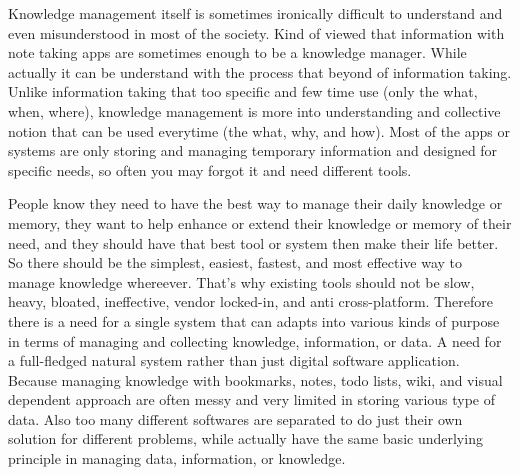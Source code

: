Knowledge management itself is sometimes ironically difficult to understand and even misunderstood in most of the society.
Kind of viewed that information with note taking apps are sometimes enough to be a knowledge manager.
While actually it can be understand with the process that beyond of information taking.
Unlike information taking that too specific and few time use (only the what, when, where), knowledge management is more into understanding and collective notion that can be used everytime (the what, why, and how).
Most of the apps or systems are only storing and managing temporary information and designed for specific needs, so often you may forgot it and need different tools.

People know they need to have the best way to manage their daily knowledge or memory, they want to help enhance or extend their knowledge or memory of their need, and they should have that best tool or system then make their life better.
So there should be the simplest, easiest, fastest, and most effective way to manage knowledge whereever.
That's why existing tools should not be slow, heavy, bloated, ineffective, vendor locked-in, and anti cross-platform.
Therefore there is a need for a single system that can adapts into various kinds of purpose in terms of managing and collecting knowledge, information, or data.
A need for a full-fledged natural system rather than just digital software application.
Because managing knowledge with bookmarks, notes, todo lists, wiki, and visual dependent approach are often messy and very limited in storing various type of data.
Also too many different softwares are separated to do just their own solution for different problems, while actually have the same basic underlying principle in managing data, information, or knowledge.

